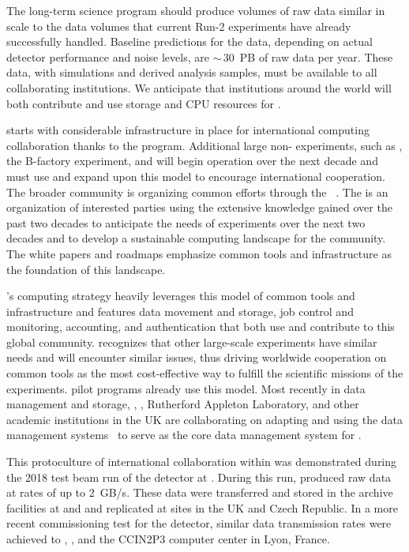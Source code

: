 The long-term  science program should produce volumes of raw data similar in scale to the data volumes that current  Run-2 experiments have already successfully handled.  Baseline predictions for the  data, depending on actual detector performance and noise levels, are $\sim\,$\SI{30}{PB} of raw data per year.  These data, with simulations and derived analysis samples, must be available to all collaborating institutions.  We anticipate that institutions around the world will both contribute and use storage and CPU resources for .




 starts with considerable infrastructure in place for international computing collaboration thanks to the  program.  Additional large non- experiments,  such as , the  B-factory experiment, and   will begin operation over the next decade and must use and expand upon this model to encourage international cooperation.  The broader  community is organizing common efforts through the ~\cite{Alves:2017she}.  The  is an organization of interested parties using the extensive knowledge gained over the past two decades to anticipate the needs of experiments   over the next two decades and to develop a sustainable computing landscape for the  community.  The  white papers and roadmaps emphasize common tools and infrastructure as the foundation of this landscape.

's computing strategy heavily leverages this model of common tools and infrastructure and features data movement and storage, job control and monitoring, accounting, and authentication that both use and contribute to this global community.    recognizes that other large-scale experiments have similar needs and will encounter similar issues, thus driving worldwide cooperation on common tools as the most cost-effective way to fulfill the scientific missions of the experiments.   pilot programs already use this model.  Most recently in data management and storage, , , Rutherford Appleton Laboratory, and other academic institutions in the %
UK are collaborating on adapting and using the  data management systems~\cite{Barisits:2019fyl}  to serve as the core data management system for .

This protoculture of international collaboration within  %
was demonstrated during the 2018 test beam run of the  detector  at .  During this run, %
 produced raw data at rates of up to \SI{2}{GB/s}.  These data were transferred and stored in the archive facilities at  and  and replicated at sites in the UK and Czech Republic.  In a more recent commissioning test for the  detector, similar data transmission rates %
were achieved to , , and the CCIN2P3 computer center in Lyon, France.

